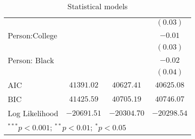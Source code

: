 \begin{table}
\begin{center}
\begin{tabular}{l c c c}
               &               &               & $(0.03)$      \\
Person:College &               &               & $-0.01$       \\
               &               &               & $(0.03)$      \\
Person: Black  &               &               & $-0.02$       \\
               &               &               & $(0.04)$      \\
\hline
AIC            & $41391.02$    & $40627.41$    & $40625.08$    \\
BIC            & $41425.59$    & $40705.19$    & $40746.07$    \\
Log Likelihood & $-20691.51$   & $-20304.70$   & $-20298.54$   \\
\hline
\multicolumn{4}{l}{\scriptsize{$^{***}p<0.001$; $^{**}p<0.01$; $^{*}p<0.05$}}
\end{tabular}
\caption{Statistical models}
\label{table:coefficients}
\end{center}
\end{table}
